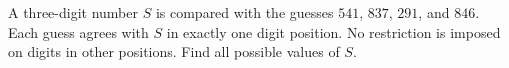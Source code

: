A three-digit number $S$ is compared with the guesses $541$, $837$, $291$, and $846$. Each guess agrees with $S$ in exactly one digit position. No restriction is imposed on digits in other positions. Find all possible values of $S$.
